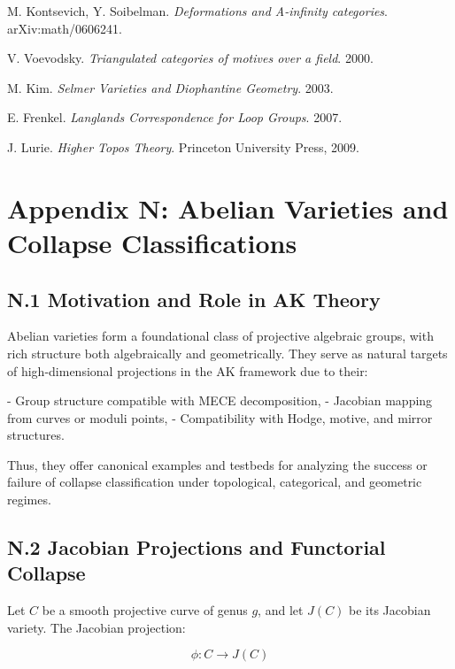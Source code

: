 \documentclass[11pt]{article}
\begin{document}
\begin{axiom}
\begin{axiom}
{{\begin{thebibliography}{9}
M. Kontsevich, Y. Soibelman.  
\textit{Deformations and A-infinity categories}. arXiv:math/0606241.

V. Voevodsky.  
\textit{Triangulated categories of motives over a field}. 2000.

M. Kim.  
\textit{Selmer Varieties and Diophantine Geometry}. 2003.

E. Frenkel.  
\textit{Langlands Correspondence for Loop Groups}. 2007.

J. Lurie.  
\textit{Higher Topos Theory}. Princeton University Press, 2009.

\end{thebibliography}



\section*{Appendix N: Abelian Varieties and Collapse Classifications}

\subsection*{N.1 Motivation and Role in AK Theory}

Abelian varieties form a foundational class of projective algebraic groups, with rich structure both algebraically and geometrically.  
They serve as natural targets of high-dimensional projections in the AK framework due to their:

- Group structure compatible with MECE decomposition,
- Jacobian mapping from curves or moduli points,
- Compatibility with Hodge, motive, and mirror structures.

Thus, they offer canonical examples and testbeds for analyzing the success or failure of collapse classification under topological, categorical, and geometric regimes.

\subsection*{N.2 Jacobian Projections and Functorial Collapse}

Let \( C \) be a smooth projective curve of genus \( g \), and let \( J(C) \) be its Jacobian variety.  
The Jacobian projection:

\[
\phi: C \longrightarrow J(C)
\]

}}
\end{axiom}
\end{axiom}
\end{document}

